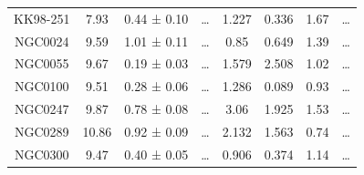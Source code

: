 \documentclass[reprint,%
 amsmath,amssymb,
 aps,
]{revtex4-1}
\begin{document}
\begin{table}[]
\begin{tabular}{cccccrrc}
\rowcolor[HTML]{F3F3F3} 
KK98-251             & 7.93                      & 0.44 ± 0.10           & …                      & 1.227                                                        & 0.336                                                         & 1.67                                                          & …                                                             \\
\rowcolor[HTML]{F3F3F3} 
NGC0024              & 9.59                      & 1.01 ± 0.11           & …                      & 0.85                                                         & 0.649                                                          & 1.39                                                          & …                                                             \\
\rowcolor[HTML]{F3F3F3} 
NGC0055              & 9.67                      & 0.19 ± 0.03           & …                      & 1.579                                                        & 2.508                                                            & 1.02                                                           & …                                                             \\
\rowcolor[HTML]{F3F3F3} 
NGC0100              & 9.51                      & 0.28 ± 0.06           & …                      & 1.286                                                        & 0.089                                                        & 0.93                                                          & …                                                             \\
\rowcolor[HTML]{F3F3F3} 
NGC0247              & 9.87                      & 0.78 ± 0.08           & …                      & 3.06                                                         & 1.925                                                        & 1.53                                                           & …                                                             \\
\rowcolor[HTML]{F3F3F3} 
NGC0289              & 10.86                     & 0.92 ± 0.09           & …                      & 2.132                                                        & 1.563                                                          & 0.74                                                            & …                                                             \\
\rowcolor[HTML]{F3F3F3} 
NGC0300              & 9.47                      & 0.40 ± 0.05           & …                      & 0.906                                                        & 0.374                                                          & 1.14                                                           & …                                                             \\

\end{tabular}
\end{table}
\end{document}
